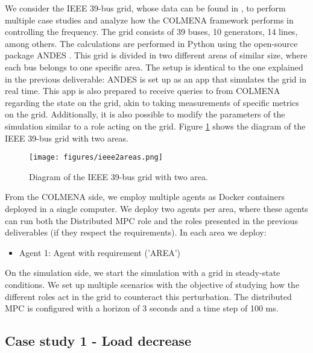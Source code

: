 \documentclass{article}
\begin{document}
We consider the IEEE 39-bus grid, whose data can be found in \cite{grids:ieee39}, to perform multiple case studies and analyze how the COLMENA framework performs in controlling the frequency. The grid consists of 39 buses, 10 generators, 14 lines, among others. The calculations are performed in Python using the open-source package ANDES \cite{grids:models}. This grid is divided in two different areas of similar size, where each bus belongs to one specific area. The setup is identical to the one explained in the previous deliverable: ANDES is set up as an app that simulates the grid in real time. This app is also prepared to receive queries to from COLMENA regarding the state on the grid, akin to taking measurements of specific metrics on the grid. Additionally, it is also possible to modify the parameters of the simulation similar to a role acting on the grid. Figure \ref{fig:ieee39_2areas} shows the diagram of the IEEE 39-bus grid with two areas.

\begin{figure}[ht]
    \centering
    \texttt{[image: figures/ieee2areas.png]}
    \caption{Diagram of the IEEE 39-bus grid with two area.}
    \label{fig:ieee39_2areas}
\end{figure}

From the COLMENA side, we employ multiple agents as Docker containers deployed in a single computer. We deploy two agents per area, where these agents can run both the Distributed MPC role and the roles presented in the previous deliverables (if they respect the requirements). In each area we deploy:

\begin{itemize}
    \item Agent 1: Agent with requirement ('AREA') 
\end{itemize}

On the simulation side, we start the simulation with a grid in steady-state conditions. We set up multiple scenarios with the objective of studying how the different roles act in the grid to counteract this perturbation. The distributed MPC is configured with a horizon of 3 seconds and a time step of 100 ms.  

\subsection{Case study 1 - Load decrease}
\end{document}
